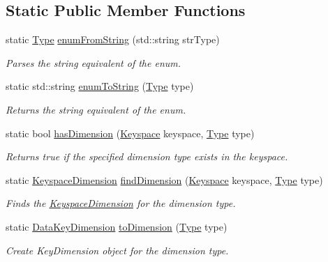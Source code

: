 \subsection*{Static Public Member Functions}
\begin{DoxyCompactItemize}
\item 
static \hyperlink{classBUSBOY_1_1DimensionCatalog_a46badf3aaaba8629b5ccf8b63b4d1fe5}{Type} \hyperlink{classBUSBOY_1_1DimensionCatalog_a7b80af8f6cd357cc76d1b596c5de5186}{enumFromString} (std::string strType)
\begin{DoxyCompactList}\small\item\em Parses the string equivalent of the enum. \item\end{DoxyCompactList}\item 
static std::string \hyperlink{classBUSBOY_1_1DimensionCatalog_acc1daaa61dddcae60237d6905d85f1aa}{enumToString} (\hyperlink{classBUSBOY_1_1DimensionCatalog_a46badf3aaaba8629b5ccf8b63b4d1fe5}{Type} type)
\begin{DoxyCompactList}\small\item\em Returns the string equivalent of the enum. \item\end{DoxyCompactList}\item 
static bool \hyperlink{classBUSBOY_1_1DimensionCatalog_a35e695e7edf0d1820f18c8121224d581}{hasDimension} (\hyperlink{classBUSBOY_1_1Keyspace}{Keyspace} keyspace, \hyperlink{classBUSBOY_1_1DimensionCatalog_a46badf3aaaba8629b5ccf8b63b4d1fe5}{Type} type)
\begin{DoxyCompactList}\small\item\em Returns true if the specified dimension type exists in the keyspace. \item\end{DoxyCompactList}\item 
static \hyperlink{classBUSBOY_1_1KeyspaceDimension}{KeyspaceDimension} \hyperlink{classBUSBOY_1_1DimensionCatalog_a5af666f102931c8633ab2a41bdf8e57e}{findDimension} (\hyperlink{classBUSBOY_1_1Keyspace}{Keyspace} keyspace, \hyperlink{classBUSBOY_1_1DimensionCatalog_a46badf3aaaba8629b5ccf8b63b4d1fe5}{Type} type)
\begin{DoxyCompactList}\small\item\em Finds the \hyperlink{classBUSBOY_1_1KeyspaceDimension}{KeyspaceDimension} for the dimension type. \item\end{DoxyCompactList}\item 
static \hyperlink{classBUSBOY_1_1DataKeyDimension}{DataKeyDimension} \hyperlink{classBUSBOY_1_1DimensionCatalog_a9646e50de520c49e7e36a93d036d106c}{toDimension} (\hyperlink{classBUSBOY_1_1DimensionCatalog_a46badf3aaaba8629b5ccf8b63b4d1fe5}{Type} type)
\begin{DoxyCompactList}\small\item\em Create KeyDimension object for the dimension type. \item\end{DoxyCompactList}\end{DoxyCompactItemize}


